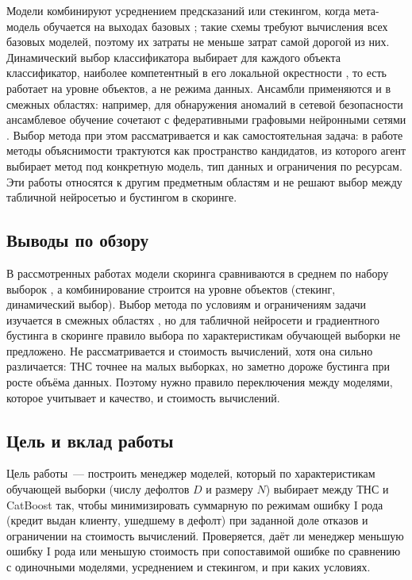 \documentclass{misisarticle}
\begin{document}
Модели комбинируют усреднением предсказаний или стекингом, когда мета-модель обучается на выходах базовых \cite{wolpert1992}; такие схемы требуют вычисления всех базовых моделей, поэтому их затраты не меньше затрат самой дорогой из них. Динамический выбор классификатора выбирает для каждого объекта классификатор, наиболее компетентный в его локальной окрестности \cite{cruz2018}, то есть работает на уровне объектов, а не режима данных. Ансамбли применяются и в смежных областях: например, для обнаружения аномалий в сетевой безопасности ансамблевое обучение сочетают с федеративными графовыми нейронными сетями \cite{arm2025}. Выбор метода при этом рассматривается и как самостоятельная задача: в работе \cite{trofimov2026} методы объяснимости трактуются как пространство кандидатов, из которого агент выбирает метод под конкретную модель, тип данных и ограничения по ресурсам. Эти работы относятся к другим предметным областям и не решают выбор между табличной нейросетью и бустингом в скоринге.

\subsection{Выводы по обзору}

В рассмотренных работах модели скоринга сравниваются в среднем по набору выборок \cite{lessmann2015}, а комбинирование строится на уровне объектов (стекинг, динамический выбор). Выбор метода по условиям и ограничениям задачи изучается в смежных областях \cite{kovalev2024,trofimov2026}, но для табличной нейросети и градиентного бустинга в скоринге правило выбора по характеристикам обучающей выборки не предложено. Не рассматривается и стоимость вычислений, хотя она сильно различается: ТНС точнее на малых выборках, но заметно дороже бустинга при росте объёма данных. Поэтому нужно правило переключения между моделями, которое учитывает и качество, и стоимость вычислений.

\subsection{Цель и вклад работы}

Цель работы~--- построить менеджер моделей, который по характеристикам обучающей выборки (числу дефолтов $D$ и размеру $N$) выбирает между ТНС и CatBoost так, чтобы минимизировать суммарную по режимам ошибку I рода (кредит выдан клиенту, ушедшему в дефолт) при заданной доле отказов и ограничении на стоимость вычислений. Проверяется, даёт ли менеджер меньшую ошибку I рода или меньшую стоимость при сопоставимой ошибке по сравнению с одиночными моделями, усреднением и стекингом, и при каких условиях.
\end{document}

